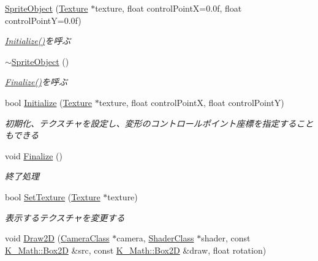 \begin{DoxyCompactItemize}
\item 
\mbox{\hyperlink{class_k___graphics_1_1_sprite_object_a9fe538248d36f9b2c20688f0053af112}{Sprite\+Object}} (\mbox{\hyperlink{class_k___graphics_1_1_texture}{Texture}} $\ast$texture, float control\+PointX=0.\+0f, float control\+Point\+Y=0.\+0f)
\begin{DoxyCompactList}\small\item\em \mbox{\hyperlink{class_k___graphics_1_1_sprite_object_a7c0ebb444b7484f20c10ba657060d779}{Initialize()}}を呼ぶ \end{DoxyCompactList}\item 
\mbox{\hyperlink{class_k___graphics_1_1_sprite_object_a8df242841b57bc345eb790b1fd24dbb9}{$\sim$\+Sprite\+Object}} ()
\begin{DoxyCompactList}\small\item\em \mbox{\hyperlink{class_k___graphics_1_1_sprite_object_ab07a1bdede7da183545bd155193d9f80}{Finalize()}}を呼ぶ \end{DoxyCompactList}\item 
bool \mbox{\hyperlink{class_k___graphics_1_1_sprite_object_a7c0ebb444b7484f20c10ba657060d779}{Initialize}} (\mbox{\hyperlink{class_k___graphics_1_1_texture}{Texture}} $\ast$texture, float control\+PointX, float control\+PointY)
\begin{DoxyCompactList}\small\item\em 初期化、テクスチャを設定し、変形のコントロールポイント座標を指定することもできる \end{DoxyCompactList}\item 
void \mbox{\hyperlink{class_k___graphics_1_1_sprite_object_ab07a1bdede7da183545bd155193d9f80}{Finalize}} ()
\begin{DoxyCompactList}\small\item\em 終了処理 \end{DoxyCompactList}\item 
bool \mbox{\hyperlink{class_k___graphics_1_1_sprite_object_a0fa1e6994fc741d94c726c85e5f1ec99}{Set\+Texture}} (\mbox{\hyperlink{class_k___graphics_1_1_texture}{Texture}} $\ast$texture)
\begin{DoxyCompactList}\small\item\em 表示するテクスチャを変更する \end{DoxyCompactList}\item 
void \mbox{\hyperlink{class_k___graphics_1_1_sprite_object_a1d9eb5352fd073b17ea42b53786fa29a}{Draw2D}} (\mbox{\hyperlink{class_k___graphics_1_1_camera_class}{Camera\+Class}} $\ast$camera, \mbox{\hyperlink{class_k___graphics_1_1_shader_class}{Shader\+Class}} $\ast$shader, const \mbox{\hyperlink{struct_k___math_1_1_box2_d}{K\+\_\+\+Math\+::\+Box2D}} \&src, const \mbox{\hyperlink{struct_k___math_1_1_box2_d}{K\+\_\+\+Math\+::\+Box2D}} \&draw, float rotation)

\end{DoxyCompactItemize}
